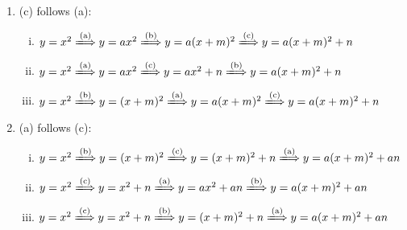 \documentclass[12pt]{article}
\begin{document}
\begin{enumerate}[1.]
	\item (c) follows (a):
		\begin{enumerate}[i.]
			\item $y=x^2 \xLongrightarrow{\text{(a)}} y = ax^2 \xLongrightarrow{\text{(b)}} y = a(x+m)^2 \xLongrightarrow{\text{(c)}} y = a(x+m)^2+n$
			\item $y=x^2 \xLongrightarrow{\text{(a)}} y=ax^2 \xLongrightarrow{\text{(c)}} y=ax^2 + n \xLongrightarrow{\text{(b)}} y=a(x+m)^2+n$
			\item $y=x^2 \xLongrightarrow{\text{(b)}} y=(x+m)^2 \xLongrightarrow{\text{(a)}} y=a(x+m)^2 \xLongrightarrow{\text{(c)}} y=a(x+m)^2+n$	
		\end{enumerate}
	\item (a) follows (c):
		\begin{enumerate}[i.]
			\item $y=x^2 \xLongrightarrow{\text{(b)}} y=(x+m)^2 \xLongrightarrow{\text{(c)}} y=(x+m)^2+n \xLongrightarrow{\text{(a)}} y=a(x+m)^2+an$
			\item $y=x^2 \xLongrightarrow{\text{(c)}} y=x^2+n \xLongrightarrow{\text{(a)}} y=ax^2+an \xLongrightarrow{\text{(b)}} y=a(x+m)^2+an$
			\item $y=x^2 \xLongrightarrow{\text{(c)}} y=x^2+n \xLongrightarrow{\text{(b)}} y=(x+m)^2+n \xLongrightarrow{\text{(a)}} y=a(x+m)^2+an$
		\end{enumerate}
\end{enumerate}
\end{document}
